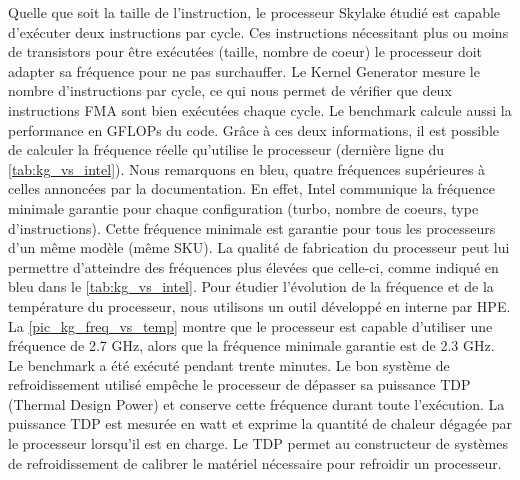     
    Quelle que soit la taille de l'instruction, le processeur Skylake étudié est capable d'exécuter deux instructions par cycle. Ces instructions nécessitant plus ou moins de transistors pour être exécutées (taille, nombre de coeur) le processeur doit adapter sa fréquence pour ne pas surchauffer.  Le Kernel Generator mesure le nombre d'instructions par cycle, ce qui nous permet de vérifier que deux instructions FMA sont bien exécutées chaque cycle. Le benchmark calcule aussi la performance en GFLOPs du code. Grâce à ces deux informations, il est possible de calculer la fréquence réelle qu'utilise le processeur (dernière ligne du  \autoref{tab:kg_vs_intel}). Nous remarquons en bleu, quatre fréquences supérieures à celles annoncées par la documentation. En effet, Intel communique la fréquence minimale garantie pour chaque configuration (turbo, nombre de coeurs, type d'instructions). Cette fréquence minimale est garantie pour tous les processeurs d'un même modèle (même SKU). La qualité de fabrication du processeur peut lui permettre d'atteindre des fréquences plus élevées que celle-ci, comme indiqué en bleu dans le \autoref{tab:kg_vs_intel}. Pour étudier l'évolution de la fréquence et de la température du processeur, nous utilisons un outil développé en interne par HPE. La \autoref{pic_kg_freq_vs_temp} montre que le processeur est capable d'utiliser une fréquence de 2.7 GHz, alors que la fréquence minimale garantie est de 2.3 GHz. Le benchmark a été exécuté pendant trente minutes. Le bon système de refroidissement utilisé empêche le processeur de dépasser sa puissance TDP (Thermal Design Power) et conserve cette fréquence durant toute l'exécution. La puissance TDP est mesurée en watt et exprime la quantité de chaleur dégagée par le processeur lorsqu'il est en charge. Le TDP permet au constructeur de systèmes de refroidissement de calibrer le matériel nécessaire pour refroidir un processeur.  
    
